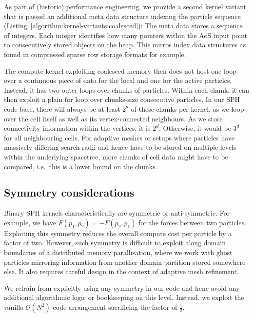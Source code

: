 

As part of (historic) performance engineering, we provide a second kernel variant that is passed an additional meta data structure indexing the particle sequence (Listing~\ref{algorithm:kernel-variants:coalesced}):
The meta data stores a sequence of integers.
Each integer identifies how many pointers within the AoS input point to consecutively stored objects on the heap.
This mirros index data structures as found in compressed sparse row storage formats \cite{Liu:1986:Compact} for example.

The compute kernel exploiting coalesced memory then does not host one loop over a continuous piece of data for the local and one for the active particles.
Instead, it has two outer loops over chunks of particles.
Within each chunk, it can then exploit a plain for loop over chunks-size consecutive particles.
In our SPH code base, there will always be at least $2^d$ of these chunks per kernel, as we loop over the cell itself as well as its vertex-connected neighbours. 
As we store connectivity information within the vertices, it is $2^d$. 
Otherwise, it would be $3^d$ for all neighbouring cells.
For adaptive meshes or setups where particles have massively differing search radii and hence have to be stored on multiple levels within the underlying spacetree, more chunks of cell data might have to be compared, i.e.~this is a lower bound on the chunks.



\subsection{Symmetry considerations}

Binary SPH kernels characteristically are symmetric or anti-symmetric.
For example, we have $F(p_1,p_2) = -F(p_2,p_1)$ for the forces between two particles.
Exploiting this symmetry reduces the overall compute cost per particle by a factor of two.
However, such symmetry is difficult to exploit along domain boundaries of a distributed memory parallisation, where we work with ghost particles mirroring information from another domain partition stored somewhere else.
It also requires careful design in the context of adaptive mesh refinement.


We refrain from explicitly using any symmetry in our code and henc avoid any additional algorithmic logic or bookkeeping on this level.
Instead, we exploit the vanilla $\mathcal{O}(N^2)$ code arrangement sacrificing the factor of $\frac{1}{2}$.


